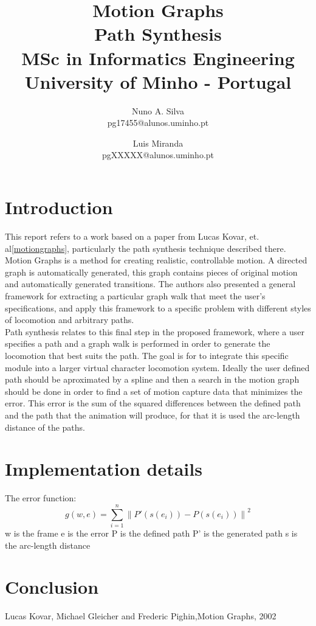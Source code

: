 \documentclass[a4paper]{article}
\title{ Motion Graphs \\ Path Synthesis \\
\small MSc in Informatics Engineering \\
\small University of Minho - Portugal
	 }
\author{
Nuno A. Silva\\ \small pg17455@alunos.uminho.pt \\
\and
Luis Miranda\\ \small pgXXXXX@alunos.uminho.pt \\
}
\begin{document}
\maketitle



\section{Introduction}
This report refers to a work based on a paper from Lucas Kovar, et. al\ref{motiongraphs}, particularly the path synthesis technique described there. Motion Graphs is a method for creating realistic, controllable motion. A directed graph is automatically generated, this graph contains pieces of original motion and automatically generated transitions. The authors also presented a general framework for extracting a particular graph walk that meet the user's specifications, and apply this framework to a specific problem with different styles of locomotion and arbitrary paths. \\

Path synthesis relates to this final step in the proposed framework, where a user specifies a path and a graph walk is performed in order to generate the locomotion that best suits the path. The goal is for to integrate this specific module into a larger virtual character locomotion system. Ideally the user defined path should be aproximated by a spline and then a search in the motion graph should be done in order to find a set of motion capture data that minimizes the error. This error is the sum of the squared differences between the defined path and the path that the animation will produce, for that it is used the arc-length distance of the paths. \\


\section{Implementation details}


The error function:
\[
g(w,e) = \sum_{i=1}^{n}\left \| P'(s(e_{i}))-P(s(e_{i})) \right \|^{2}
\]
w is the frame
e is the error
P is the defined path
P' is the generated path
s is the arc-length distance



\section{Conclusion}



\begin{thebibliography}{}

{Lucas Kovar, Michael Gleicher and Frederic Pighin},{Motion Graphs}, {2002}
    
    
\end{thebibliography} 
\end{document}
